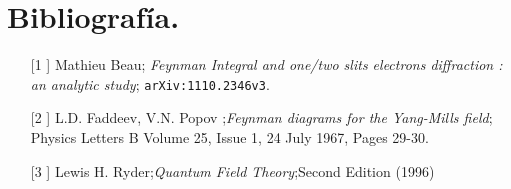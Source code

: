 \chapter{Bibliografía.}
\begin{itemize}
\item[[1]] Mathieu Beau; \textit{Feynman Integral and one/two slits electrons diffraction : an analytic study}; \texttt{arXiv:1110.2346v3}.
\item[[2]]  L.D. Faddeev,  V.N. Popov ;\textit{Feynman diagrams for the Yang-Mills field}; Physics Letters B Volume 25, Issue 1, 24 July 1967, Pages 29-30.
\item[[3]] Lewis H. Ryder;\textit{Quantum Field Theory};Second Edition (1996) 


\end{itemize}